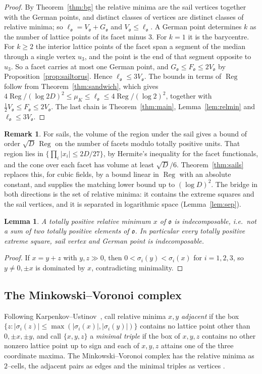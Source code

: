 \documentclass[11pt,reqno]{amsart}
\theoremstyle{plain}
\newtheorem{lemma}[theorem]{Lemma}
\theoremstyle{definition}
\newtheorem{remark}[theorem]{Remark}
\newcommand{\Reg}{\operatorname{Reg}}
\newcommand{\Ok}{\mathfrak{o}}
\newcommand{\muK}{\mu_K}
\begin{document}
\begin{proof}
By Theorem~\ref{thm:bg} the relative minima are the sail vertices together with the German points, and
distinct classes of vertices are distinct classes of relative minima; so $\ell_\Ok=V_\Ok+G_\Ok$ and
$V_\Ok\le\ell_\Ok$. A German point determines $k$ as the number of lattice points of its facet minus $3$.
For $k=1$ it is the barycentre. For $k\ge2$ the interior lattice points of the facet span a segment of the
median through a single vertex $u_3$, and the point is the end of that segment opposite to $u_3$. So a
facet carries at most one German point, and $G_\Ok\le F_\Ok\le2V_\Ok$ by Proposition~\ref{prop:sailtorus}.
Hence $\ell_\Ok\le3V_\Ok$. The bounds in terms of $\Reg$ follow from Theorem~\ref{thm:sandwich}, which gives
$4\Reg/(\log2D)^2\le\muK\le\ell_\Ok\le4\Reg/(\log2)^2$, together with $\tfrac12V_\Ok\le F_\Ok\le2V_\Ok$.
The last chain is Theorem~\ref{thm:main}, Lemma~\ref{lem:relmin} and $\ell_\Ok\le3V_\Ok$.
\end{proof}

\begin{remark}
For sails, the volume of the region under the sail gives a bound of order $\sqrt D\,\Reg$ on the
number of facets modulo totally positive units. That region lies in $\{\prod_i|x_i|\le 2D/27\}$, by
Hermite's inequality for the facet functionals, and the cone over each facet has volume at least
$\sqrt D/6$. Theorem~\ref{thm:sails} replaces
this, for cubic fields, by a bound linear in $\Reg$ with an absolute constant, and supplies the matching
lower bound up to $(\log D)^2$. The bridge in both directions is the set of relative minima: it contains
the extreme squares and the sail vertices, and it is separated in logarithmic space
(Lemma~\ref{lem:sep}).
\end{remark}

\begin{lemma}\label{lem:indec}
A totally positive relative minimum $x$ of $\Ok$ is indecomposable, i.e.\ not a sum of two totally positive
elements of $\Ok$. In particular every totally positive extreme square, sail vertex and German point is
indecomposable.
\end{lemma}

\begin{proof}
If $x=y+z$ with $y,z\gg0$, then $0<\sigma_i(y)<\sigma_i(x)$ for $i=1,2,3$, so $y\ne0,\pm x$ is dominated by
$x$, contradicting minimality.
\end{proof}

\subsection{The Minkowski--Voronoi complex}
Following Karpenkov--Ustinov~\cite[\S2]{KU}, call relative minima $x,y$ \emph{adjacent} if the box
$\{z:|\sigma_i(z)|\le\max(|\sigma_i(x)|,|\sigma_i(y)|)\}$ contains no lattice point other than $0,\pm x,\pm y$,
and call $\{x,y,z\}$ a \emph{minimal triple} if the box of $x,y,z$ contains no other nonzero lattice point up
to sign and each of $x,y,z$ attains one of the three coordinate maxima. The Minkowski--Voronoi complex has
the relative minima as $2$--cells, the adjacent pairs as edges and the minimal triples as vertices
\cite[Def.~2.5]{KU}.
\end{document}
